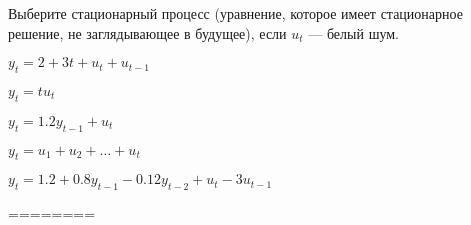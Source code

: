 
\begin{question}
Выберите стационарный процесс (уравнение, которое имеет стационарное
решение, не заглядывающее в будущее), если \(u_t\) --- белый шум.
\begin{answerlist}[2]
  \item \(y_t = 2 + 3t + u_t + u_{t-1}\)
  \item \(y_t = tu_{t}\)
  \item \(y_t = 1.2 y_{t-1} + u_t\)
  \item \(y_t = u_1 + u_2 + \ldots + u_t\)
  \item \(y_t = 1.2 + 0.8 y_{t-1} - 0.12 y_{t-2} + u_t - 3u_{t-1}\)
\end{answerlist}
\end{question}

\begin{solution}
========
\end{solution}

